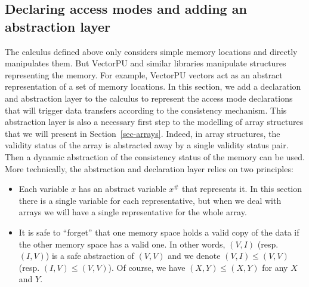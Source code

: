 \documentclass[preprint,12pt]{elsarticle}
\newcommand{\symb}[1]{\textit{#1}}
\newcommand{\Pull}{\symb{Pull}}
\newcommand{\isvalid}{\symb{isValid}}
\newcommand{\abs}[1]{#1^\#}
\begin{document}
%


\subsection{Declaring access modes and adding an abstraction layer}
The calculus defined above only considers simple memory locations and directly manipulates 
them.
But VectorPU and  similar libraries manipulate structures 
representing the memory. For example, VectorPU vectors act as an
 abstract representation of a set of memory 
locations. In this section, we add a declaration and abstraction layer to the calculus to 
represent the access mode declarations that will trigger data transfers according to the 
consistency mechanism. 
This abstraction layer is also a necessary first step to the modelling of array 
structures that we will present in Section~\ref{sec-arrays}. Indeed, in array structures, 
the 
validity status of the array is abstracted away by a single validity status pair. Then 
a dynamic abstraction of the consistency status of the memory can be used.
More technically, the abstraction and declaration layer relies on two principles:
\begin{itemize}
\item Each variable $x$ has an abstract variable $\abs x$ that represents it. In this 
section there is 
a single variable for each representative, but when we deal with arrays we will 
have a single representative for the whole array.
\item It is safe to ``forget'' that one memory space holds a valid copy of the data if 
the other memory space has a valid one. In other words, $(V,I)$ (resp. $(I,V)$) is a safe 
abstraction of $(V,V)$ and we denote $(V,I)\leq (V,V)$ (resp. $(I,V)\leq (V,V)$). Of 
course, we have $(X,Y)\leq (X,Y)$ for any $X$ and $Y$.
\end{itemize}
\end{document}

